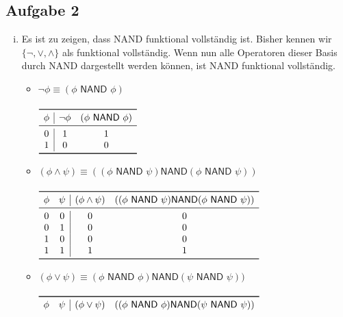 \documentclass[a4paper,10pt]{article}
\begin{document}
\subsection*{Aufgabe 2}
\begin{enumerate}[(i)]
\item Es ist zu zeigen, dass \textsf{NAND} funktional vollständig ist. Bisher kennen wir $\{\lnot, \lor, \land\}$ als funktional vollständig. Wenn nun alle Operatoren dieser Basis durch \textsf{NAND} dargestellt werden können, ist \textsf{NAND} funktional vollständig.
\begin{itemize}
\item $\lnot\phi \equiv (\phi \textsf{ NAND } \phi)$ \\
\\
\begin{math}
\begin{array}{c|cc}
\toprule 
\phi & \lnot \phi & (\phi \textsf{ NAND } \phi) \\
\midrule
0 & 1 & 1 \\
1 & 0 & 0 \\
\bottomrule
\end{array}
\end{math}
\\
\item $(\phi \land \psi) \equiv ((\phi \textsf{ NAND } \psi) \textsf{NAND} (\phi \textsf{ NAND } \psi))$\\
\\
\begin{math}
\begin{array}{cc|cc}
\toprule 
\phi & \psi & (\phi \land  \psi) & ((\phi \textsf{ NAND } \psi) \textsf{NAND} (\phi \textsf{ NAND } \psi))  \\
\midrule
0 & 0 & 0 & 0 \\
0 & 1 & 0 & 0 \\
1 & 0 & 0 & 0 \\
1 & 1 & 1 & 1 \\
\bottomrule
\end{array}
\end{math}
\\
\item $(\phi \lor \psi) \equiv (\phi \textsf{ NAND } \phi) \textsf{NAND} (\psi \textsf{ NAND } \psi))$\\
\\
\begin{math}
\begin{array}{cc|cc}
\toprule 
\phi & \psi & (\phi \lor  \psi) & ((\phi \textsf{ NAND } \phi) \textsf{NAND} (\psi \textsf{ NAND } \psi)) \\

\end{array}
\end{math}
\end{itemize}
\end{enumerate}
\end{document}
